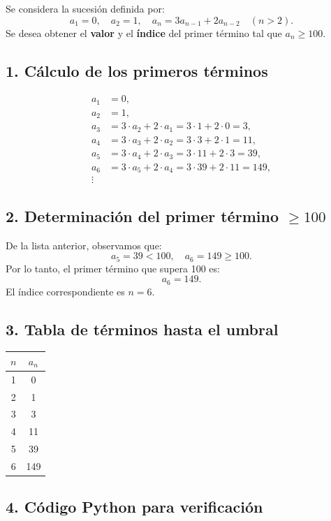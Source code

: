 \documentclass[12pt]{article}
\begin{document}
Se considera la sucesión definida por:
\[
a_1 = 0,\quad a_2 = 1,\quad a_n = 3a_{n-1} + 2a_{n-2}\quad (n > 2).
\]
Se desea obtener el \textbf{valor} y el \textbf{índice} del primer término tal que \(a_n \ge 100\).

\subsection*{1. Cálculo de los primeros términos}

\[
\begin{aligned}
a_1 &= 0,\\
a_2 &= 1,\\
a_3 &= 3\cdot a_2 + 2\cdot a_1 = 3\cdot1 + 2\cdot0 = 3,\\
a_4 &= 3\cdot a_3 + 2\cdot a_2 = 3\cdot3 + 2\cdot1 = 11,\\
a_5 &= 3\cdot a_4 + 2\cdot a_3 = 3\cdot11 + 2\cdot3 = 39,\\
a_6 &= 3\cdot a_5 + 2\cdot a_4 = 3\cdot39 + 2\cdot11 = 149,\\
\vdots
\end{aligned}
\]

\subsection*{2. Determinación del primer término \(\ge 100\)}

De la lista anterior, observamos que:
\[
a_5 = 39 < 100, 
\quad a_6 = 149 \ge 100.
\]
Por lo tanto, el primer término que supera 100 es:
\[
\boxed{a_6 = 149}.
\]
El índice correspondiente es \(n = 6\).

\subsection*{3. Tabla de términos hasta el umbral}

\begin{center}
\begin{tabular}{c|c}
\toprule
\(n\) & \(a_n\) \\
\midrule
1 & 0    \\
2 & 1    \\
3 & 3    \\
4 & 11   \\
5 & 39   \\
6 & 149  \\
\bottomrule
\end{tabular}
\end{center}

\subsection*{4. Código Python para verificación}
\end{document}
